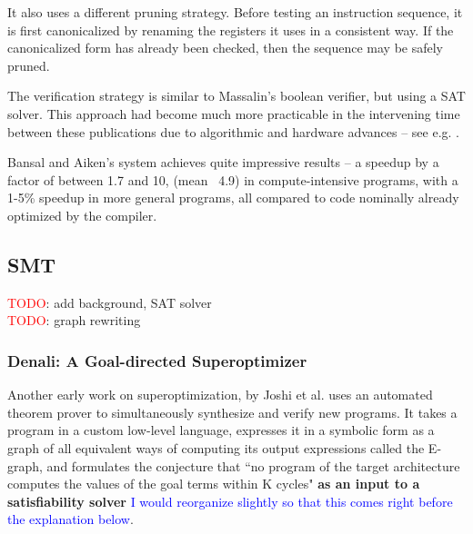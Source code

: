 \documentclass[12pt,twoside]{reedthesis}
\newcommand{\red}[1]{\textcolor{red}{#1}}
\newcommand{\comment}[2]{\textbf{#1} \textcolor{blue}{#2}}
\newcommand{\addressed}[2]{{#1}}
\begin{document}
            It also uses a different pruning strategy.
            Before testing an instruction sequence, it is first canonicalized by renaming the registers it uses in a consistent way.
            If the canonicalized form has already been checked, then the sequence may be safely pruned.
                
            The verification strategy is similar to Massalin's boolean verifier, but using a SAT solver.
            This approach had become much more practicable in the intervening time between these publications due to algorithmic and hardware advances -- see e.g. \cite{silva1996grasp}.
                
            Bansal and Aiken's system achieves quite impressive results 
                -- a speedup by a factor of between 1.7 and 10, (mean ~4.9) in compute-intensive programs, with a 1-5\% speedup in more general programs, all compared to code nominally already optimized by the compiler.

    \subsection{SMT}
        \red{TODO}: add background, SAT solver
    \\  \red{TODO}: graph rewriting

        \subsubsection{Denali: A Goal-directed Superoptimizer}
            Another early work on superoptimization, by Joshi et al. \cite{joshi2002denali} uses an automated theorem prover to simultaneously synthesize and verify new programs.
            It takes a program in a custom low-level language, expresses it in a symbolic form as a graph of all equivalent ways of computing its output expressions
                \addressed{called the E-graph}{I would be inclined to have a separate description of E-graphs, but it depends on the structure of the section},
                and formulates the conjecture that ``no program of the target architecture computes the values of the goal terms within K cycles"
                    \comment{as an input to a satisfiability solver}{I would reorganize slightly so that this comes right before the explanation below}. 
                
\end{document}
